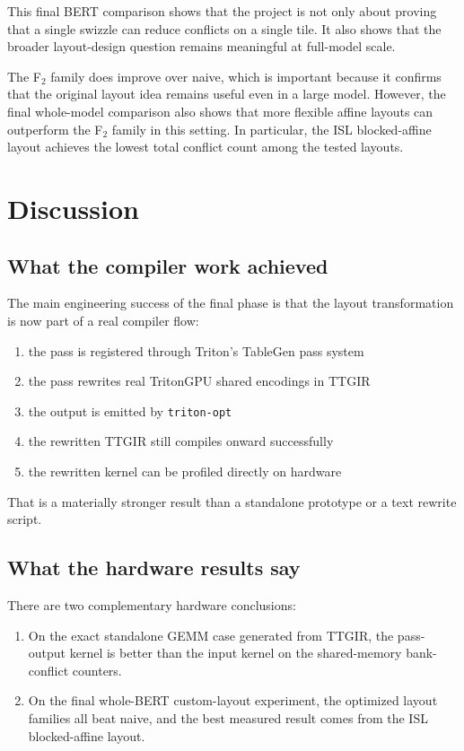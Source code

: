 \documentclass[11pt,a4paper]{article}
\begin{document}
This final BERT comparison shows that the project is not only about proving
that a single swizzle can reduce conflicts on a single tile.  It also shows
that the broader layout-design question remains meaningful at full-model scale.

The F$_2$ family does improve over naive, which is important because it
confirms that the original layout idea remains useful even in a large model.
However, the final whole-model comparison also shows that more flexible affine
layouts can outperform the F$_2$ family in this setting.  In particular, the
ISL blocked-affine layout achieves the lowest total conflict count among the
tested layouts.

\section{Discussion}

\subsection{What the compiler work achieved}

The main engineering success of the final phase is that the layout
transformation is now part of a real compiler flow:

\begin{enumerate}
\item the pass is registered through Triton's TableGen pass system
\item the pass rewrites real TritonGPU shared encodings in TTGIR
\item the output is emitted by \texttt{triton-opt}
\item the rewritten TTGIR still compiles onward successfully
\item the rewritten kernel can be profiled directly on hardware
\end{enumerate}

That is a materially stronger result than a standalone prototype or a text
rewrite script.

\subsection{What the hardware results say}

There are two complementary hardware conclusions:

\begin{enumerate}
\item On the exact standalone GEMM case generated from TTGIR, the pass-output
      kernel is better than the input kernel on the shared-memory bank-conflict
      counters.
\item On the final whole-BERT custom-layout experiment, the optimized layout
      families all beat naive, and the best measured result comes from the ISL
      blocked-affine layout.
\end{enumerate}
\end{document}
